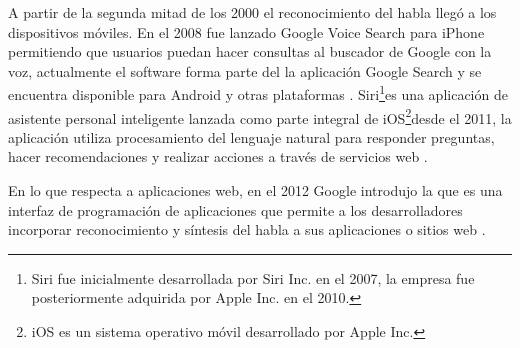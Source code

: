 A partir de la segunda mitad de los 2000 el reconocimiento del habla lleg\'{o} a los dispositivos m\'{o}viles. En el 2008
fue lanzado Google Voice Search para iPhone permitiendo que usuarios puedan hacer consultas al buscador de Google
con la voz, actualmente el software forma parte del la aplicaci\'{o}n Google Search y se encuentra disponible 
para Android y otras plataformas \cite{GoogleSearch}. Siri\footnote{Siri fue inicialmente desarrollada por Siri Inc. en el
2007, la empresa fue posteriormente adquirida por Apple Inc. en el 2010.}es una aplicaci\'{o}n de asistente personal inteligente
lanzada como parte integral de iOS\footnote{iOS es un sistema operativo m\'{o}vil 
desarrollado por Apple Inc.}desde el 2011, la aplicaci\'{o}n
utiliza procesamiento del lenguaje natural para responder preguntas, hacer recomendaciones y realizar acciones a trav\'{e}s
de servicios web \cite{AppleSiri}.

En lo que respecta a aplicaciones web, en el 2012 Google introdujo la  que es una interfaz de 
programaci\'{o}n de aplicaciones que permite a los desarrolladores incorporar 
reconocimiento y s\'{i}ntesis del habla a sus aplicaciones o sitios web \cite{GoogleWebSpeechAPI}.
